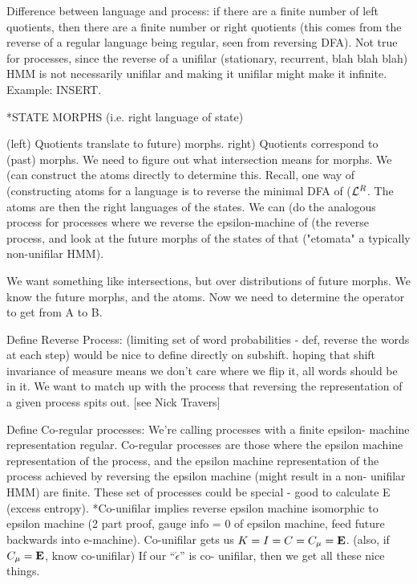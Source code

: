 \documentclass[prl,twocolumn,showpacs,superscriptaddress,preprintnumbers,floatfix]{revtex4-1}
\newcommand{\etomata}{\ensuremath{\acute{\epsilon}}\text{tomata}\xspace}
\begin{document}
Difference between language and process: if there are a finite number of left
quotients, then there are a finite number or right quotients (this comes from
the reverse of a regular language being regular, seen from reversing DFA).  Not
true for processes, since the reverse of a unifilar (stationary, recurrent, blah
blah blah) HMM is not necessarily unifilar and making it unifilar might make it
infinite. Example: INSERT.

*STATE MORPHS (i.e. right language of state)

(left) Quotients translate to future) morphs. right) Quotients correspond to
(past) morphs.  We need to figure out what intersection means for morphs.  We
(can construct the atoms directly to determine this.  Recall, one way of
(constructing atoms for a language \Language is to reverse the minimal DFA of
($\mathcal{L}^{R}$.  The atoms are then the right languages of the states. We can
(do the analogous process for processes where we reverse the epsilon-machine of
(the reverse process, and look at the future morphs of the states of that
("etomata" a typically non-unifilar HMM).

We want something like intersections, but over distributions of future morphs.
We know the future morphs, and the atoms.  Now we need to determine the operator
to get from A to B.

Define Reverse Process: (limiting set of word probabilities - def, reverse the
words at each step) would be nice to define directly on subshift. hoping that
shift invariance of measure means we don't care where we flip it, all words
should be in it.  We want to match up with the process that reversing the
\eM representation of a given process spits out. [see Nick Travers]

Define Co-regular processes: We're calling processes with a finite epsilon-
machine representation regular. Co-regular processes are those where the epsilon
machine representation of the process, and the epsilon machine representation of
the process achieved by reversing the epsilon machine (might result in a non-
unifilar HMM) are finite.  These set of processes could be special - good to
calculate E (excess entropy).  *Co-unifilar implies reverse epsilon machine
isomorphic to epsilon machine (2 part proof, gauge info = 0 of epsilon machine,
feed future backwards into e-machine). Co-unifilar gets us $K = I = C = C_\mu
= {\bf E}$.  (also, if $C_\mu = {\bf E}$, know co-unifilar) If our ``\etomata'' is co-
unifilar, then we get all these nice things.
\end{document}
